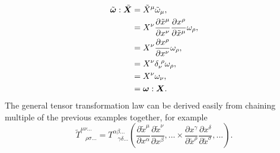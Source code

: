 \begin{align}
\tilde{\boldsymbol \omega} : \tilde{\boldsymbol X} &= \tilde{X}^\mu \tilde{\omega}_\mu ,\\
                                   &= {X}^\nu \frac{\partial \tilde{x}^\mu}{\partial x^\nu}   \frac{\partial x^\rho}{\partial \tilde{x}^\mu}\omega_\rho, \\
                                   &=X^\nu \frac{\partial x^\rho}{\partial x^\nu} \omega_\rho , \\
                                   &=X^\nu \delta_\nu^{\,\,\rho} \omega_\rho , \\
                                   &=X^\nu\omega_\nu,\\
                                   &= \boldsymbol{\omega}:\boldsymbol{X}.
\end{align}
The general tensor transformation law can be derived easily from chaining multiple of the previous examples together, for example
\begin{equation} \label{intro:eq:tensortrans}
\tilde{T}^{\mu\nu...}_{\,\,\,\,\,\rho\sigma...} = T^{\alpha\beta...}_{\,\,\,\,\,\gamma\delta...}\left(
\frac{\partial \tilde{x}^\mu}{\partial x^\alpha}\frac{\partial \tilde{x}^\nu}{\partial x^\beta},...\times\frac{\partial x^\gamma}{\partial \tilde{x}^\rho}\frac{\partial x^\delta}{\partial \tilde{x}^\sigma},...\right).
\end{equation}



